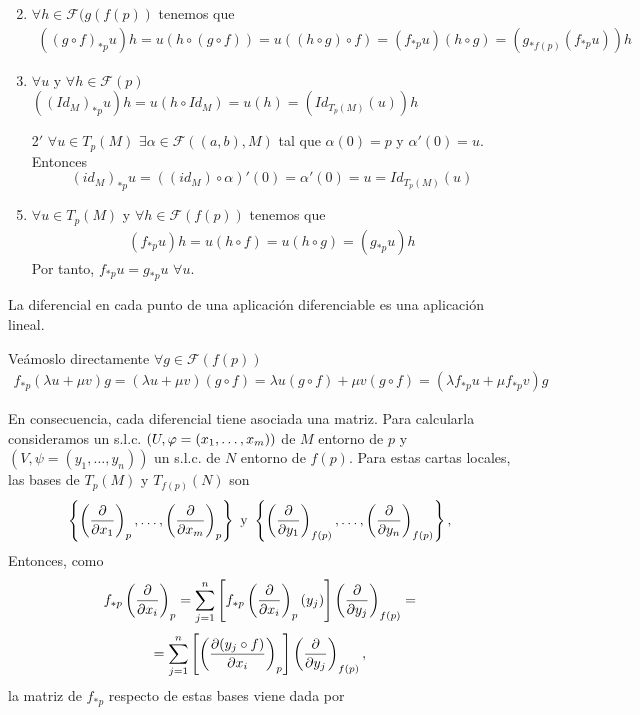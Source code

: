 \documentclass[Cursovd_portada.tex]{subfiles}
\begin{document}
\begin{dem}
\begin{enumerate}
\item[]
\item $\forall h \in \mathcal{F}(g(f(p))$ tenemos que 
\begin{gather*}
((g\circ f)_{\ast p}u)h = u(h\circ(g \circ f)) = u ((h\circ g) \circ f) = (f_{\ast p}u)(h \circ g) = (g_{\ast f(p)}(f_{\ast p} u))h
\end{gather*}
\item $\forall u$ y $\forall h \in \mathcal{F}(p)$ $((Id_M)_{\ast p}u)h = u(h \circ Id_M) = u(h)=(Id_{T_p(M)}(u))h$
\item[2$'$] $\forall u \in T_p(M)$ $\exists \alpha\in \mathcal{F}((a,b),M)$ tal que $\alpha(0)=p$ y $\alpha'(0)=u$. Entonces
$$
(id_M)_{\ast p}u = ((id_M)\circ \alpha)'(0) = \alpha'(0) = u = Id_{T_p(M)}(u)
$$
\item $\forall u \in T_p(M)$ y $\forall h\in \mathcal{F}(f(p))$ tenemos que 
\begin{gather*}
(f_{\ast p}u)h = u(h\circ f)=u(h \circ g) = (g_{\ast p} u)h
\end{gather*}
Por tanto, $f_{\ast p}u=g_{\ast p}u$ $\forall u$.
\end{enumerate}
\end{dem}
\begin{prop}
La diferencial en cada punto de una aplicación diferenciable es una aplicación lineal.
\end{prop}
\begin{dem}
Veámoslo directamente $\forall g\in \mathcal{F}(f(p))$
\begin{gather*}
 f_{\ast p}(\lambda u+\mu v)g = (\lambda u+\mu v)(g\circ f)= \lambda u(g \circ f)+\mu v(g \circ f) = (\lambda f_{\ast p} u + \mu f_{\ast p}v)g
\end{gather*}
\end{dem}
En consecuencia, cada diferencial tiene asociada una matriz. Para calcularla consideramos un s.l.c. $(U,\varphi=(x_1,\dots ,x_m))$  de $M$ entorno de $p$ y $(V,\psi=(y_1,\dots ,y_n))$ un s.l.c. de $N$ entorno de $f(p)$. Para estas cartas
locales, las bases de $T_p(M)$ y $T_{f(p)}(N)$ son
$$\left\{\left(\displaystyle{\frac{\partial}{\partial x_1}}\right)_p,\dots ,\left(\displaystyle{\frac{\partial}{\partial x_m}}\right)_p\right\}\mbox{ }{\rm y}\mbox{
}\left\{\left(\displaystyle{\frac{\partial}{\partial y_1}}\right)_{f(p)},\dots ,\left(\displaystyle{\frac{\partial}{\partial y_n}}\right)_{f(p)}\right\},$$
Entonces, como
$$f_{*p}\left(\displaystyle{\frac{\partial}{\partial x_i}}\right)_p=\sum_{j=1}^n\left[f_{*p}\left(\displaystyle{\frac{\partial}{\partial x_i}}\right)_p(y_j)\right]\left(\displaystyle{\frac{\partial}{\partial y_j}}
\right)_{f(p)}=$$ $$=\sum_{j=1}^n\left[\left(\displaystyle{\frac{\partial (y_j\circ f)}{\partial x_i}}\right)_p\right]\left(\displaystyle{\frac{\partial}{\partial y_j}}
\right)_{f(p)},$$ la matriz de $f_{*p}$ respecto de estas bases viene dada por
\end{document}

